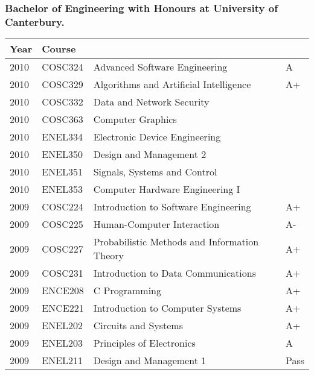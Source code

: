 \documentclass[10pt]{article}
\begin{document}
        \subsubsection*{Bachelor of Engineering with Honours at University of Canterbury.}
            {\footnotesize
            \begin{tabularx}{\textwidth}{llXl}
                \hline
                \textbf{Year} & \textbf{Course} & & \\
                \hline
                2010 & COSC324 & Advanced Software Engineering                      & A    \\
                2010 & COSC329 & Algorithms and Artificial Intelligence             & A+   \\
                2010 & COSC332 & Data and Network Security                          &      \\
                2010 & COSC363 & Computer Graphics                                  &      \\
                2010 & ENEL334 & Electronic Device Engineering                      &      \\
                2010 & ENEL350 & Design and Management 2                            &      \\
                2010 & ENEL351 & Signals, Systems and Control                       &      \\
                2010 & ENEL353 & Computer Hardware Engineering I                    &      \\
                2009 & COSC224 & Introduction to Software Engineering               & A+   \\
                2009 & COSC225 & Human-Computer Interaction                         & A-   \\
                2009 & COSC227 & Probabilistic Methods and Information Theory       & A+   \\
                2009 & COSC231 & Introduction to Data Communications                & A+   \\
                2009 & ENCE208 & C Programming                                      & A+   \\
                2009 & ENCE221 & Introduction to Computer Systems                   & A+   \\
                2009 & ENEL202 & Circuits and Systems                               & A+   \\
                2009 & ENEL203 & Principles of Electronics                          & A    \\
                2009 & ENEL211 & Design and Management 1                            & Pass \\
                \hline
            \end{tabularx}
            }
\end{document}
